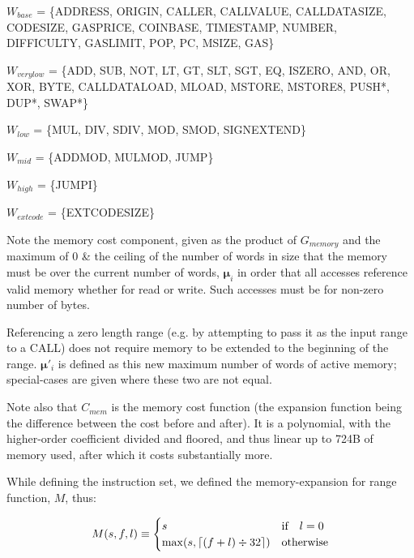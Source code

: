 \documentclass[9pt,oneside]{amsart}
\DeclarePairedDelimiter{\ceil}{\lceil}{\rceil}
\begin{document}
$W_{base}$ = \{{\small ADDRESS}, {\small ORIGIN}, {\small CALLER}, {\small CALLVALUE}, {\small CALLDATASIZE}, {\small CODESIZE}, {\small GASPRICE}, {\small COINBASE},\newline \noindent\hspace*{1cm} {\small TIMESTAMP}, {\small NUMBER}, {\small DIFFICULTY}, {\small GASLIMIT}, {\small POP}, {\small PC}, {\small MSIZE}, {\small GAS}\}

$W_{verylow}$ = \{{\small ADD}, {\small SUB}, {\small NOT}, {\small LT}, {\small GT}, {\small SLT}, {\small SGT}, {\small EQ}, {\small ISZERO}, {\small AND}, {\small OR}, {\small XOR}, {\small BYTE}, {\small CALLDATALOAD}, \newline \noindent\hspace*{1cm} {\small MLOAD}, {\small MSTORE}, {\small MSTORE8}, {\small PUSH*}, {\small DUP*}, {\small SWAP*}\}

$W_{low}$ = \{{\small MUL}, {\small DIV}, {\small SDIV}, {\small MOD}, {\small SMOD}, {\small SIGNEXTEND}\}

$W_{mid}$ = \{{\small ADDMOD}, {\small MULMOD}, {\small JUMP}\}

$W_{high}$ = \{{\small JUMPI}\}

$W_{extcode}$ = \{{\small EXTCODESIZE}\}

Note the memory cost component, given as the product of $G_{memory}$ and the maximum of 0 \& the ceiling of the number of words in size that the memory must be over the current number of words, $\boldsymbol{\mu}_i$ in order that all accesses reference valid memory whether for read or write. Such accesses must be for non-zero number of bytes.

Referencing a zero length range (e.g. by attempting to pass it as the input range to a CALL) does not require memory to be extended to the beginning of the range. $\boldsymbol{\mu}'_i$ is defined as this new maximum number of words of active memory; special-cases are given where these two are not equal.

Note also that $C_{mem}$ is the memory cost function (the expansion function being the difference between the cost before and after). It is a polynomial, with the higher-order coefficient divided and floored, and thus linear up to 724B of memory used, after which it costs substantially more.

While defining the instruction set, we defined the memory-expansion for range function, $M$, thus:

\begin{equation}
M(s, f, l) \equiv \begin{cases}
s & \text{if} \quad l = 0 \\
\max(s, \ceil{ (f + l) \div 32 }) & \text{otherwise}
\end{cases}
\end{equation}
\end{document}

